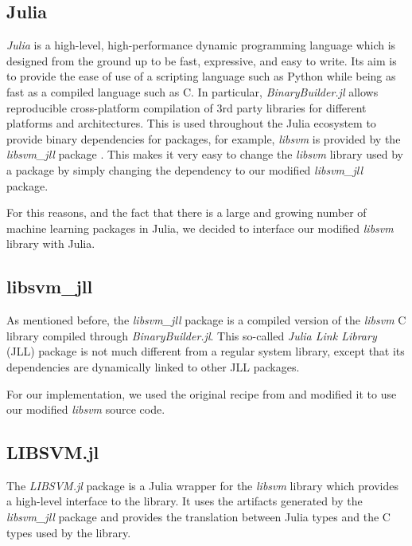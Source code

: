\subsection{Julia}

\emph{Julia} \cite{bezanson2017julia} is a high-level, high-performance dynamic programming language
which is designed from the ground up to be fast, expressive, and easy to write. Its aim is to provide
the ease of use of a scripting language such as Python while being as fast as a compiled language
such as C. In particular, \emph{BinaryBuilder.jl} \cite{JLLPackagesBinaryBuilder} allows reproducible
cross-platform compilation of 3rd party libraries for different platforms and architectures.
This is used throughout the Julia ecosystem to provide binary dependencies for packages,
for example, \emph{libsvm} is provided by the \emph{libsvm\_jll} package \cite{LibsvmJllJl2022}.
This makes it very easy to change the \emph{libsvm} library used by a package by simply changing
the dependency to our modified \emph{libsvm\_jll} package.

For this reasons, and the fact that there is a large and growing number of machine learning
packages in Julia, we decided to interface our modified \emph{libsvm} library with Julia.

\subsection{libsvm\_jll}

As mentioned before, the \emph{libsvm\_jll} package is a compiled version of the \emph{libsvm} C library
compiled through \emph{BinaryBuilder.jl}. This so-called \emph{Julia Link Library} (JLL) package
is not much different from a regular system library, except that its dependencies are dynamically
linked to other JLL packages.

For our implementation, we used the original recipe from \textcite{LibsvmJllJl2022} and modified it
to use our modified \emph{libsvm} source code.

\subsection{LIBSVM.jl}

The \emph{LIBSVM.jl} package \cite{LIBSVMJl2023} is a Julia wrapper for the \emph{libsvm} library which
provides a high-level interface to the library. It uses the artifacts generated by the \emph{libsvm\_jll}
package and provides the translation between Julia types and the C types used by the library.

